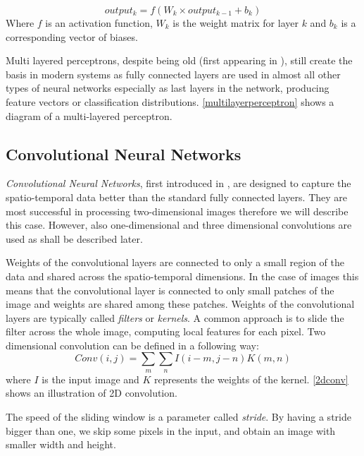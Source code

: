 $$output_k = f(W_k \times output_{k-1} + b_k)$$
Where $f$ is an activation function, $W_k$ is the weight matrix for layer $k$ and $b_k$ is a corresponding vector of biases.\par  
Multi layered perceptrons, despite being old (first appearing in \cite{rosenblatt_principles_1961}), still create the basis in modern systems as fully connected layers are used in almost all other types of neural networks especially as last layers in the network, producing feature vectors or classification distributions. \autoref{multilayerperceptron} shows a diagram of a multi-layered perceptron.



\subsection{Convolutional Neural Networks}
\textit{Convolutional Neural Networks}, first introduced in \cite{lecun_backpropagation_1989}, are designed to capture the spatio-temporal data better than the standard fully connected layers. They are most successful in processing two-dimensional images therefore we will describe this case. However, also one-dimensional and three dimensional convolutions are used as shall be described later.  \par
Weights of the convolutional layers are connected to only a small region of the data and shared across the spatio-temporal dimensions. In the case of images this means that the convolutional layer is connected to only small patches of the image and weights are shared among these patches. Weights of the convolutional layers are typically called \textit{filters} or \textit{kernels}. A common approach is to slide the filter across the whole image,  computing local features for each pixel.
Two dimensional convolution can be defined in a following way:
$$Conv(i,j) = \sum_m {\sum_n {I(i-m,j-n)K(m,n)}}$$ where $I$ is the input image and $K$ represents the weights of the kernel. \autoref{2dconv} shows an illustration of 2D convolution. \par
The speed of the sliding window is a parameter called \textit{stride}. By having a stride bigger than one, we skip some pixels in the input, and obtain an image with smaller width and height.\par 



